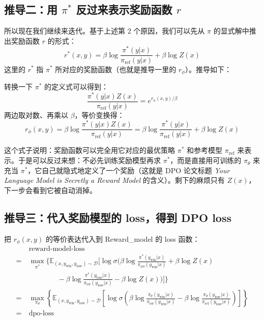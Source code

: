 \documentclass[UTF8,fontset=fandol]{ctexart}
\begin{document}
\subsection{推导二：用 \texorpdfstring{\(\pi^*\)}{pi*} 反过来表示奖励函数 \texorpdfstring{\(r\)}{r}}

所以现在我们继续来迭代。基于上述第 2 个原因，我们可以先从 \(\pi\) 的显式解中推出奖励函数 \(r\) 的形式：
\[
r^*(x, y) = \beta \log \frac{\pi^*(y|x)}{\pi_{\text{ref}}(y|x)} + \beta \log Z(x)
\]
这里的 \(r^*\) 指 \(\pi^*\) 所对应的奖励函数（也就是推导一里的 \(r_\phi\)）。推导如下：

转换一下 \(\pi^*\) 的定义式可以得到：
\[
\frac{\pi^*(y|x)Z(x)}{\pi_{\text{ref}}(y|x)} = e^{r_\phi(x,y)/\beta}
\]
两边取对数、再乘以 \(\beta\)，等价变换得：
\[
r_\phi(x,y) = \beta \log \frac{\pi^*(y|x)Z(x)}{\pi_{\text{ref}}(y|x)} = \beta \log \frac{\pi^*(y|x)}{\pi_{\text{ref}}(y|x)} + \beta \log Z(x)
\]

这个式子说明：奖励函数可以完全用它对应的最优策略 \(\pi^*\) 和参考模型 \(\pi_{\text{ref}}\) 来表示。于是可以反过来想：不必先训练奖励模型再求 \(\pi^*\)，而是直接用可训练的 \(\pi_\theta\) 来充当 \(\pi^*\)，它自己就隐式地定义了一个奖励（这就是 DPO 论文标题 \emph{Your Language Model is Secretly a Reward Model} 的含义）。剩下的麻烦只有 \(Z(x)\)，下一步会看到它被自动消掉。

\subsection{推导三：代入奖励模型的 loss，得到 DPO loss}

把 \(r_\phi(x,y)\) 的等价表达代入到 Reward\_model 的 loss 函数：
\[
\begin{aligned}
& \text{reward-model-loss} \\
=\ & \max_{\pi^*} \Bigg\{ \mathbb{E}_{(x,y_{\text{win}},y_{\text{lose}})\sim\mathcal{D}} \Bigg[ \log \sigma \Bigg( \beta \log \frac{\pi^*(y_{\text{win}}|x)}{\pi_{\text{ref}}(y_{\text{win}}|x)} + \beta \log Z(x) \\
& \qquad\qquad - \beta \log \frac{\pi^*(y_{\text{lose}}|x)}{\pi_{\text{ref}}(y_{\text{lose}}|x)} - \beta \log Z(x) \Bigg) \Bigg] \Bigg\} \\
=\ & \max_{\pi_\theta} \left\{ \mathbb{E}_{(x,y_{\text{win}},y_{\text{lose}})\sim\mathcal{D}} \left[ \log \sigma \left( \beta \log \frac{\pi_\theta(y_{\text{win}}|x)}{\pi_{\text{ref}}(y_{\text{win}}|x)} - \beta \log \frac{\pi_\theta(y_{\text{lose}}|x)}{\pi_{\text{ref}}(y_{\text{lose}}|x)} \right) \right] \right\} \\
=\ & \text{dpo-loss}
\end{aligned}
\]
\end{document}
